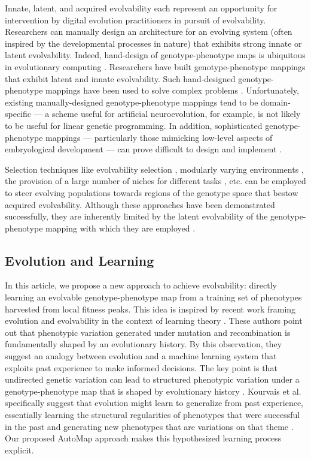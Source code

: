 Innate, latent, and acquired evolvability each represent an opportunity for intervention by digital evolution practitioners in pursuit of evolvability.
Researchers can manually design an architecture for an evolving system (often inspired by the developmental processes in nature) that exhibits strong innate \cite{clune2011performance} or latent \cite{reisinger2005towards} evolvability.
Indeed, hand-design of genotype-phenotype maps is ubiquitous in evolutionary computing \cite{wagner1996perspective}.
Researchers have built genotype-phenotype mappings that exhibit latent \cite{reisinger2007acquiring} and innate \cite{stanley2009hypercube, clune2011performance} evolvability.
Such hand-designed genotype-phenotype mappings have been used to solve complex problems \cite{woolley2010evolving, cheney2013unshackling}.
Unfortunately, existing manually-designed genotype-phenotype mappings tend to be domain-specific --- a scheme useful for artificial neuroevolution, for example, is not likely to be useful for linear genetic programming.
In addition, sophisticated genotype-phenotype mappings --- particularly those mimicking low-level aspects of embryological development --- can prove difficult to design and implement \cite[p 223]{downing2015intelligence}.

Selection techniques like evolvability selection \cite{mengistu2016evolvability}, modularly varying environments \cite{kashtan2005spontaneous}, the provision of a large number of niches for different tasks \cite{nguyen2015innovation}, etc. can be employed to steer evolving populations towards regions of the genotype space that bestow acquired evolvability.
Although these approaches have been demonstrated successfully, they are inherently limited by the latent evolvability of the genotype-phenotype mapping with which they are employed \cite{reisinger2005towards}.

\subsection{Evolution and Learning}

In this article, we propose a new approach to achieve evolvability: directly learning an evolvable genotype-phenotype map from a training set of phenotypes harvested from local fitness peaks.
This idea is inspired by recent work framing evolution and evolvability in the context of learning theory \cite{kouvaris2017evolution, watson2016can}.
These authors point out that phenotypic variation generated under mutation and recombination is fundamentally shaped by an evolutionary history.
By this observation, they suggest an analogy between evolution and a machine learning system that exploits past experience to make informed decisions.
The key point is that undirected genetic variation can lead to structured phenotypic variation under a genotype-phenotype map that is shaped by evolutionary history \cite{watson2016can}.
Kourvais et al. specifically suggest that evolution might learn to generalize from past experience, essentially learning the structural regularities of phenotypes that were successful in the past and generating new phenotypes that are variations on that theme \cite{kouvaris2017evolution}.
Our proposed AutoMap approach makes this hypothesized learning process explicit.

